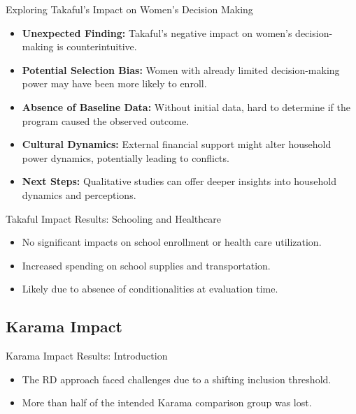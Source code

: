 \documentclass{beamer}
\begin{document}
\begin{frame}{Exploring Takaful's Impact on Women’s Decision Making}
\begin{itemize}
    \item \textbf{Unexpected Finding:} Takaful's negative impact on women’s decision-making is counterintuitive.
    \item \textbf{Potential Selection Bias:} Women with already limited decision-making power may have been more likely to enroll.
    \item \textbf{Absence of Baseline Data:} Without initial data, hard to determine if the program caused the observed outcome.
    \item \textbf{Cultural Dynamics:} External financial support might alter household power dynamics, potentially leading to conflicts.
    \item \textbf{Next Steps:} Qualitative studies can offer deeper insights into household dynamics and perceptions.
\end{itemize}
\end{frame}


\begin{frame}{Takaful Impact Results: Schooling and Healthcare}
\begin{itemize}
    \item No significant impacts on school enrollment or health care utilization.
    \item Increased spending on school supplies and transportation.
    \item Likely due to absence of conditionalities at evaluation time.
\end{itemize}
\end{frame}


\subsection{Karama Impact}

\begin{frame}{Karama Impact Results: Introduction}
\begin{itemize}
    \item The RD approach faced challenges due to a shifting inclusion threshold.
    \item More than half of the intended Karama comparison group was lost.
\end{itemize}
\end{frame}
\end{document}
